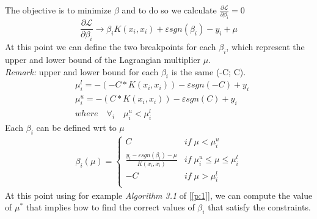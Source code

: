 \documentclass[12pt]{article}
\newcommand{\Lagr}{\mathcal{L}}
\begin{document}
    The objective is to minimize $\beta$ and to do so we calculate $\frac{\partial\Lagr}{\partial\beta_i} = 0$
    \begin{equation}\label{eq:10}
        \frac{\partial\Lagr}{\partial\beta_i} \longrightarrow \beta_i K(x_i,x_i) 
        + \varepsilon sgn(\beta_i)
        - y_i
        + \mu
    \end{equation}
    At this point we can define the two breakpoints for each $\beta_i$, which represent the upper and lower bound of the Lagrangian multiplier $\mu$.\\
    \emph{Remark:} upper and lower bound for each $\beta_i$ is the same (-C; C).
    \begin{equation}
        \begin{aligned}
            &\mu_i^l = -(-C * K(x_i,x_i)) - \varepsilon sgn(-C) + y_i \\
            &\mu_i^u = -(C * K(x_i,x_i)) - \varepsilon sgn(C) + y_i \\
            &where \quad \forall_i \quad \mu_i^u < \mu_i^l
        \end{aligned}
    \end{equation}
    Each $\beta_i$ can be defined wrt to $\mu$
    \begin{equation}
        \begin{aligned}
            \beta_i(\mu) = 
            \begin{cases}
                C \qquad &if\;\mu < \mu_i^u\\
                \frac{y_i - \varepsilon sgn(\beta_i) -\mu}{K(x_i,x_i)} &if\; \mu_i^u \leq \mu \leq \mu_i^l\\
                -C &if\;\mu > \mu_i^l\\
            \end{cases}
        \end{aligned}
    \end{equation}
    At this point using for example \emph{Algorithm 3.1} of [\ref{p:1}], we can compute the value of $\mu^*$ that implies how to find the correct values of $\beta_i$ that satisfy the constraints.
    
    \pagebreak
    
\end{document}
